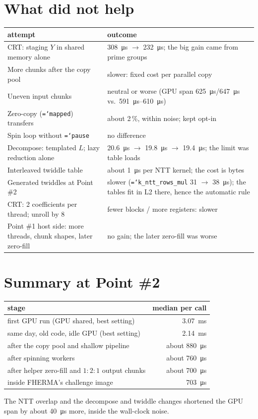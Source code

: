 \documentclass[11pt,a4paper]{article}
\newcommand{\code}[1]{\texttt{\hyphenchar\font=`\-\relax #1}}
\newcommand{\us}[1]{\SI{#1}{\micro\second}}
\newcommand{\ms}[1]{\SI{#1}{\milli\second}}
\begin{document}
\section{What did not help}
\begin{center}
\begin{tabular}{p{}p{}}
\toprule
attempt & outcome \\
\midrule
CRT: staging $Y$ in shared memory alone & \us{308} $\to$ \us{232}; the big gain came from
  prime groups \\
More chunks after the copy pool & slower: fixed cost per parallel copy \\
Uneven input chunks & neutral or worse (GPU span \us{625}/\us{647} vs.\ \us{591}--\us{610}) \\
Zero-copy (\code{mapped}) transfers & about 2\,\%, within noise; kept opt-in \\
Spin loop without \code{pause} & no difference \\
Decompose: templated $L$; lazy reduction alone & \us{20.6} $\to$ \us{19.8} $\to$ \us{19.4};
  the limit was table loads \\
Interleaved twiddle table & about \us{1} per NTT kernel; the cost is bytes \\
Generated twiddles at Point \#2 & slower (\code{k\_ntt\_rows\_mul} 31 $\to$ \us{38}); the
  tables fit in L2 there, hence the automatic rule \\
CRT: 2 coefficients per thread; unroll by 8 & fewer blocks / more registers: slower \\
Point \#1 host side: more threads, chunk shapes, later zero-fill & no gain; the later
  zero-fill was worse \\
\bottomrule
\end{tabular}
\end{center}

\section{Summary at Point \#2}
\begin{center}
\begin{tabular}{lr}
\toprule
stage & median per call \\
\midrule
first GPU run (GPU shared, best setting) & \ms{3.07} \\
same day, old code, idle GPU (best setting) & \ms{2.14} \\
after the copy pool and shallow pipeline & about \us{880} \\
after spinning workers & about \us{760} \\
after helper zero-fill and $1{:}2{:}1$ output chunks & about \us{700} \\
inside FHERMA's challenge image & \us{703} \\
\bottomrule
\end{tabular}
\end{center}
The NTT overlap and the decompose and twiddle changes shortened the GPU span by about
\us{40} more, inside the wall-clock noise.
\end{document}

